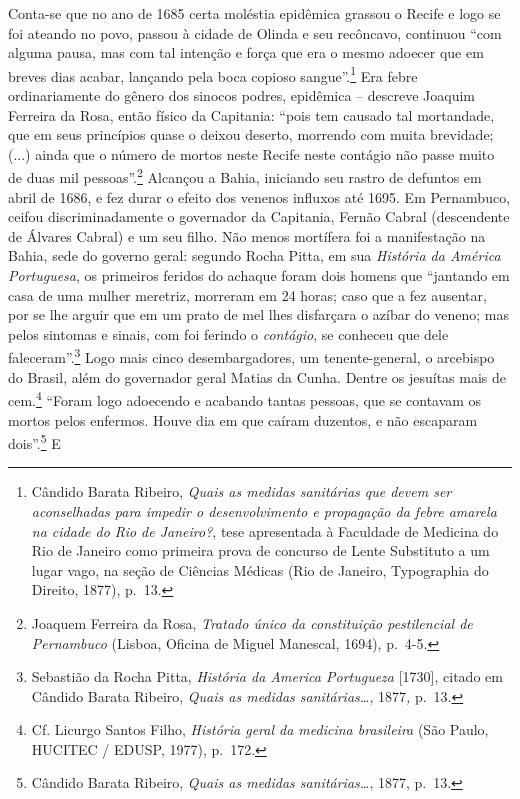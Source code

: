 Conta-se que no ano de 1685 certa moléstia epidêmica grassou o Recife e
logo se foi ateando no povo, passou à cidade de Olinda e seu recôncavo,
continuou ``com alguma pausa, mas com tal intenção e força que era o
mesmo adoecer que em breves dias acabar, lançando pela boca copioso
sangue''.\footnote{Cândido Barata Ribeiro, \emph{Quais as medidas
  sanitárias que devem ser aconselhadas para impedir o desenvolvimento e
  propagação da febre amarela na cidade do Rio de Janeiro?}, tese
  apresentada à Faculdade de Medicina do Rio de Janeiro como primeira
  prova de concurso de Lente Substituto a um lugar vago, na seção de
  Ciências Médicas (Rio de Janeiro, Typographia do Direito, 1877),
  p.~13.} Era febre ordinariamente do gênero dos sinocos podres,
epidêmica -- descreve Joaquim Ferreira da Rosa, então físico da
Capitania: ``pois tem causado tal mortandade, que em seus princípios
quase o deixou deserto, morrendo com muita brevidade; (...) ainda que o
número de mortos neste Recife neste contágio não passe muito de duas mil
pessoas''.\footnote{Joaquem Ferreira da Rosa, \emph{Tratado único da
  constituição pestilencial de Pernambuco} (Lisboa, Oficina de Miguel
  Manescal, 1694), p.~4-5.} Alcançou a Bahia, iniciando seu rastro de
defuntos em abril de 1686, e fez durar o efeito dos venenos influxos até
1695. Em Pernambuco, ceifou discriminadamente o governador da Capitania,
Fernão Cabral (descendente de Álvares Cabral) e um seu filho. Não menos
mortífera foi a manifestação na Bahia, sede do governo geral: segundo
Rocha Pitta, em sua \emph{História da América Portuguesa}, os primeiros
feridos do achaque foram dois homens que ``jantando em casa de uma
mulher meretriz, morreram em 24 horas; caso que a fez ausentar, por se
lhe arguir que em um prato de mel lhes disfarçara o azíbar do veneno;
mas pelos sintomas e sinais, com foi ferindo o \emph{contágio}, se
conheceu que dele faleceram''.\footnote{Sebastião da Rocha Pitta,
  \emph{História da America Portugueza} {[}1730{]}, citado em Cândido
  Barata Ribeiro, \emph{Quais as medidas sanitárias\ldots{}},
  1877\emph{,} p.~13.} Logo mais cinco desembargadores, um
tenente-general, o arcebispo do Brasil, além do governador geral Matias
da Cunha. Dentre os jesuítas mais de cem.\footnote{Cf. Licurgo Santos
  Filho, \emph{História geral da medicina brasileira} (São Paulo,
  HUCITEC / EDUSP, 1977), p.~172.} ``Foram logo adoecendo e acabando
tantas pessoas, que se contavam os mortos pelos enfermos. Houve dia em
que caíram duzentos, e não escaparam dois''.\footnote{Cândido Barata
  Ribeiro, \emph{Quais as medidas sanitárias\ldots{}}, 1877, p.~13.} E
